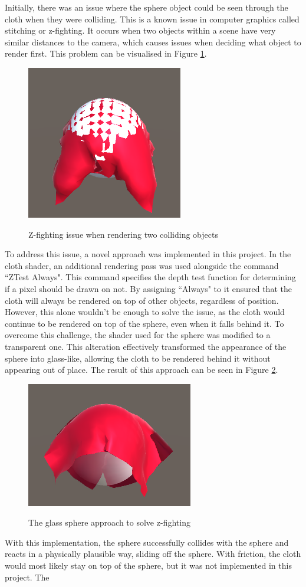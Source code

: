 \documentclass[12pt,a4paper]{article}
\begin{document}
Initially, there was an issue where the sphere object could be seen through the cloth when they were colliding. This is a known issue in computer graphics called stitching or z-fighting. It occurs when two objects within a scene have very similar distances to the camera, which causes issues when deciding what object to render first. This problem can be visualised in Figure \ref{fig:zfight}. \\
\begin{figure}
	\centering
	\caption{Z-fighting issue when rendering two colliding objects}
	\includegraphics[scale=0.5]{zfight.png}
	\label{fig:zfight}
\end{figure}

To address this issue, a novel approach was implemented in this project. In the cloth shader, an additional rendering pass was used alongside the command ``ZTest Always". This command specifies the depth test function for determining if a pixel should be drawn on not. By assigning ``Always" to it ensured that the cloth will always be rendered on top of other objects, regardless of position. \\

However, this alone wouldn't be enough to solve the issue, as the cloth would continue to be rendered on top of the sphere, even when it falls behind it. To overcome this challenge, the shader used for the sphere was modified to a transparent one. This alteration effectively transformed the appearance of the sphere into glass-like, allowing the cloth to be rendered behind it without appearing out of place. The result of this approach can be seen in Figure \ref{fig:spherefixed}.
\begin{figure}[h]
	\centering
	\caption{The glass sphere approach to solve z-fighting}
	\includegraphics[scale=0.5]{spherefixed.png}
	\label{fig:spherefixed}
\end{figure}
With this implementation, the sphere successfully collides with the sphere and reacts in a physically plausible way, sliding off the sphere. With friction, the cloth would most likely stay on top of the sphere, but it was not implemented in this project. The 
\end{document}
